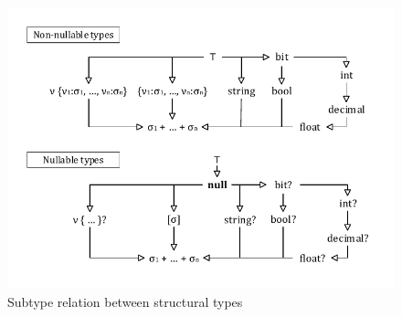 \documentclass[preprint]{sigplanconf}
\begin{document}
\begin{figure}
\begin{center}
\includegraphics[scale=0.75,trim=5mm 5mm 5mm 5mm,clip]{images/hierarchy.pdf} %
\end{center}
\vspace{-0.5em}
\caption{Subtype relation between structural types}
\label{fig:subtyping-diagram}
\vspace{-0.5em}
\end{figure}

\end{document}
